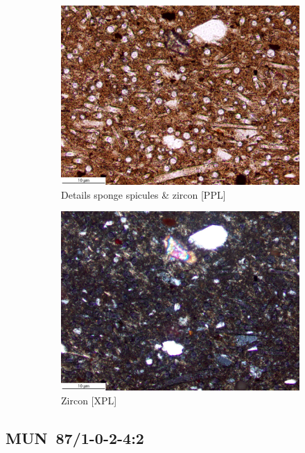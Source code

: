 \documentclass[a4paper]{article}
\begin{document}
\begin{figure}[H]
\begin{subfigure}[t]{.49\textwidth}
		\includegraphics[width=\textwidth]{ThinSections/109-2_20x_PPL.jpg}
		\caption{Details sponge spicules \& zircon [PPL]}
	\end{subfigure}\hspace{.5em}\hfill
	\begin{subfigure}[t]{.49\textwidth}
		\includegraphics[width=\textwidth]{ThinSections/109-2_20x_XPL.jpg}
		\caption{Zircon [XPL]}
	\end{subfigure}	
	\caption{}
	\label{fig:109_mun}
\end{figure}

\newpage\subsection{MUN~87/1-0-2-4:2 \citep[mun\#110; Fig.~\ref{fig:mun.pottery}.11; Ebambe style;][470 Pl.~89.2]{Seidensticker.2021e}}
\end{document}
